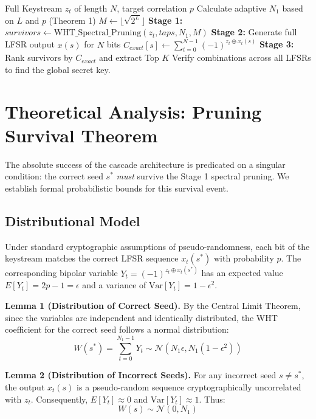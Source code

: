 \begin{algorithm}[h]
\caption{Two-Stage Cascade WHT Correlation Attack}
\label{alg:cascade}
\begin{algorithmic}[1]
\Require Full Keystream $z_t$ of length $N$, target correlation $p$
\State Calculate adaptive $N_1$ based on $L$ and $p$ (Theorem 1)
\State $M \gets \lfloor \sqrt{2^L} \rfloor$
\State \textbf{Stage 1:}
\State $survivors \gets \text{WHT\_Spectral\_Pruning}(z_t, taps, N_1, M)$
\State \textbf{Stage 2:}
    \State Generate full LFSR output $x(s)$ for $N$ bits
    \State $C_{exact}[s] \gets \sum_{t=0}^{N-1} (-1)^{z_t \oplus x_t(s)}$
\EndFor
\State \textbf{Stage 3:}
\State Rank survivors by $C_{exact}$ and extract Top $K$
\State Verify combinations across all LFSRs to find the global secret key.
\end{algorithmic}
\end{algorithm}

\section{Theoretical Analysis: Pruning Survival Theorem}
\label{sec:pruning_theorem}

The absolute success of the cascade architecture is predicated on a singular condition: the correct seed $s^*$ \textit{must} survive the Stage 1 spectral pruning. We establish formal probabilistic bounds for this survival event.

\subsection{Distributional Model}
Under standard cryptographic assumptions of pseudo-randomness, each bit of the keystream matches the correct LFSR sequence $x_t(s^*)$ with probability $p$. The corresponding bipolar variable $Y_t = (-1)^{z_t \oplus x_t(s^*)}$ has an expected value $E[Y_t] = 2p-1 = \epsilon$ and a variance of $\text{Var}[Y_t] = 1-\epsilon^2$.

\textbf{Lemma 1 (Distribution of Correct Seed).} By the Central Limit Theorem, since the variables are independent and identically distributed, the WHT coefficient for the correct seed follows a normal distribution:
\begin{equation}
    W(s^*) = \sum_{t=0}^{N_1-1} Y_t \sim \mathcal{N}\left(N_1 \epsilon, N_1(1-\epsilon^2)\right)
\end{equation}

\textbf{Lemma 2 (Distribution of Incorrect Seeds).} For any incorrect seed $s \neq s^*$, the output $x_t(s)$ is a pseudo-random sequence cryptographically uncorrelated with $z_t$. Consequently, $E[Y_t] \approx 0$ and $\text{Var}[Y_t] \approx 1$. Thus:
\begin{equation}
    W(s) \sim \mathcal{N}(0, N_1)
\end{equation}

